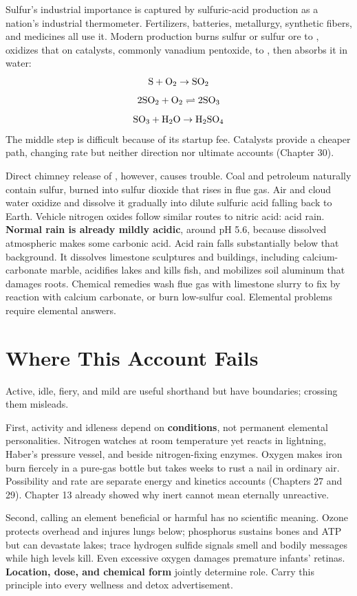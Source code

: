 Sulfur's industrial importance is captured by sulfuric-acid production as a nation's industrial thermometer. Fertilizers, batteries, metallurgy, synthetic fibers, and medicines all use it. Modern production burns sulfur or sulfur ore to , oxidizes that on catalysts, commonly vanadium pentoxide, to , then absorbs it in water:
\[\mathrm{S} + \mathrm{O_2} \rightarrow \mathrm{SO_2}\]
\[\mathrm{2SO_2} + \mathrm{O_2} \rightleftharpoons \mathrm{2SO_3}\]
\[\mathrm{SO_3} + \mathrm{H_2O} \rightarrow \mathrm{H_2SO_4}\]
The middle step is difficult because of its startup fee. Catalysts provide a cheaper path, changing rate but neither direction nor ultimate accounts (Chapter 30).

Direct chimney release of , however, causes trouble. Coal and petroleum naturally contain sulfur, burned into sulfur dioxide that rises in flue gas. Air and cloud water oxidize and dissolve it gradually into dilute sulfuric acid falling back to Earth. Vehicle nitrogen oxides follow similar routes to nitric acid: acid rain. \textbf{Normal rain is already mildly acidic}, around pH 5.6, because dissolved atmospheric  makes some carbonic acid. Acid rain falls substantially below that background. It dissolves limestone sculptures and buildings, including calcium-carbonate marble, acidifies lakes and kills fish, and mobilizes soil aluminum that damages roots. Chemical remedies wash flue gas with limestone slurry to fix  by reaction with calcium carbonate, or burn low-sulfur coal. Elemental problems require elemental answers.

\section{Where This Account Fails}

Active, idle, fiery, and mild are useful shorthand but have boundaries; crossing them misleads.

First, activity and idleness depend on \textbf{conditions}, not permanent elemental personalities. Nitrogen watches at room temperature yet reacts in lightning, Haber's pressure vessel, and beside nitrogen-fixing enzymes. Oxygen makes iron burn fiercely in a pure-gas bottle but takes weeks to rust a nail in ordinary air. Possibility and rate are separate energy and kinetics accounts (Chapters 27 and 29). Chapter 13 already showed why inert cannot mean eternally unreactive.

Second, calling an element beneficial or harmful has no scientific meaning. Ozone protects overhead and injures lungs below; phosphorus sustains bones and ATP but can devastate lakes; trace hydrogen sulfide signals smell and bodily messages while high levels kill. Even excessive oxygen damages premature infants' retinas. \textbf{Location, dose, and chemical form} jointly determine role. Carry this principle into every wellness and detox advertisement.

